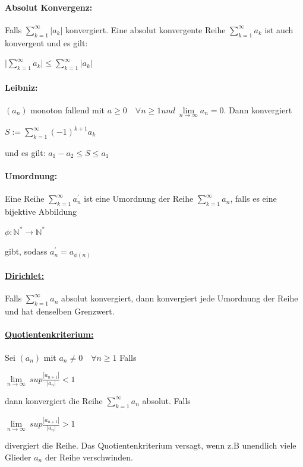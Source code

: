 \documentclass[8pt]{extreport}
\begin{document}
\paragraph{Absolut Konvergenz:} Falls $\displaystyle\sum_{k=1}^{\infty}|a_{k}|$ konvergiert. Eine absolut konvergente Reihe $\displaystyle\sum_{k=1}^{\infty}a_{k}$ ist auch konvergent und es gilt:
\begin{center}
$\bigg|\displaystyle\sum_{k=1}^{\infty}a_{k}\bigg| \leq \displaystyle\sum_{k=1}^{\infty}|a_{k}|$ 
\end{center}
\paragraph{Leibniz:} $(a_{n})$ monoton fallend mit $a\geq 0 \quad \forall n \geq 1 und \ \lim\limits_{n \to\infty} a_{n} = 0$. Dann konvergiert
\begin{center}
$S:= \displaystyle\sum_{k=1}^{\infty}(-1)^{k+1}a_{k}$
\end{center}
und es gilt: $a_1 - a_2 \leq S \leq a_1$
\paragraph{Umordnung:} Eine Reihe $\displaystyle\sum _{k=1}^{\infty} a_{n}^{'}$ ist eine Umordnung der Reihe  $\displaystyle\sum _{k=1}^{\infty} a_{n}$, falls es eine bijektive Abbildung
\begin{center}
$\phi:  \mathbb{N}^* \rightarrow \mathbb{N}^*$
\end{center}
gibt, sodass $ a_{n}^{'} = a_{\phi(n)}$
\paragraph{\underline{Dirichlet:}} Falls  $\displaystyle\sum _{k=1}^{\infty} a_{n}$ absolut konvergiert, dann konvergiert jede Umordnung der Reihe und hat denselben Grenzwert.  
\paragraph{\underline{Quotientenkriterium:}} Sei $(a_n)$ mit $a_n \neq 0 \quad \forall n \geq 1$ Falls
\begin{center}
$\lim\limits_{n \to \infty} \ sup\frac{|a_{n+1}|}{|a_n|} < 1$
\end{center}
dann konvergiert  die Reihe  $\displaystyle\sum _{k=1}^{\infty} a_{n}$ absolut. Falls
\begin{center}
$\lim\limits_{n \to \infty} \ sup\frac{|a_{n+1}|}{|a_n|} > 1$
\end{center}
divergiert die Reihe. Das Quotientenkriterium versagt, wenn z.B unendlich viele Glieder $a_n$ der Reihe verschwinden.
\end{document}
